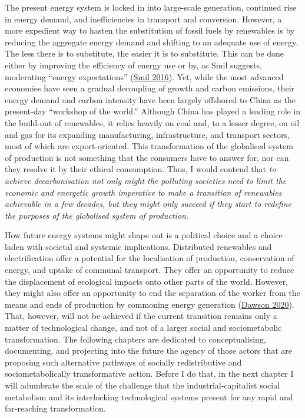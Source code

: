 \documentclass[a4paper, nobind]{templates/ociamthesis}
\begin{document}
The present energy system is locked in into large-scale generation, continued rise in energy demand, and inefficiencies in transport and conversion. However, a more expedient way to hasten the substitution of fossil fuels by renewables is by reducing the aggregate energy demand and shifting to an adequate use of energy. The less there is to substitute, the easier it is to substitute. This can be done either by improving the efficiency of energy use or by, as Smil suggests, moderating ``energy expectations'' (\protect\hyperlink{ref-smil_energy_2016}{Smil 2016}). Yet, while the most advanced economies have seen a gradual decoupling of growth and carbon emissions, their energy demand and carbon intensity have been largely offshored to China as the present-day ``workshop of the world.'' Although China has played a leading role in the build-out of renewables, it relies heavily on coal and, to a lesser degree, on oil and gas for its expanding manufacturing, infrastructure, and transport sectors, most of which are export-oriented. This transformation of the globalised system of production is not something that the consumers have to answer for, nor can they resolve it by their ethical consumption. Thus, I would contend that \emph{to achieve decarbonisation not only might the polluting societies need to limit the economic and energetic growth imperative to make a transition of renewables achievable in a few decades, but they might only succeed if they start to redefine the purposes of the globalised system of production.}

How future energy systems might shape out is a political choice and a choice laden with societal and systemic implications. Distributed renewables and electrification offer a potential for the localisation of production, conservation of energy, and uptake of communal transport. They offer an opportunity to reduce the displacement of ecological impacts onto other parts of the world. However, they might also offer an opportunity to end the separation of the worker from the means and ends of production by commoning energy generation (\protect\hyperlink{ref-dawson_peoples_2020}{Dawson 2020}). That, however, will not be achieved if the current transition remains only a matter of technological change, and not of a larger social and sociometabolic transformation. The following chapters are dedicated to conceptualising, documenting, and projecting into the future the agency of those actors that are proposing such alternative pathways of socially redistributive and sociometabolically transformative action. Before I do that, in the next chapter I will adumbrate the scale of the challenge that the industrial-capitalist social metabolism and its interlocking technological systems present for any rapid and far-reaching transformation.
\end{document}

